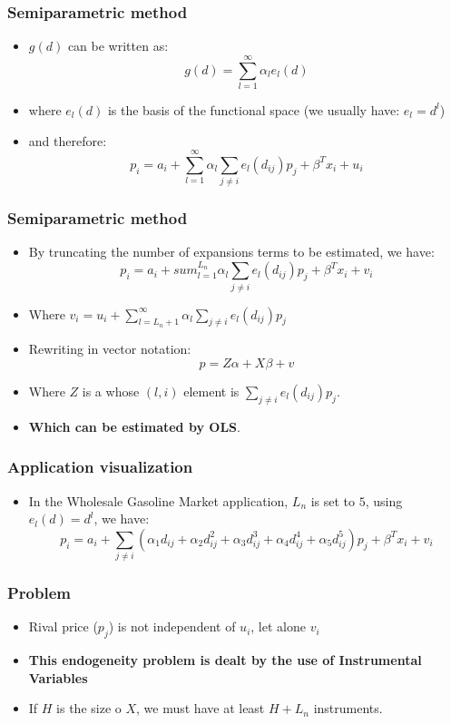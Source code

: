 \documentclass{beamer}
\begin{document}
\begin{frame}
  \frametitle{Semiparametric method}
  \begin{itemize}
    \item $g(d)$ can be written as:
      \[g(d) = \sum^{\infty}_{l=1} \alpha_l e_l(d)\]
    \item where $e_l(d)$ is the basis of the functional space (we usually have: $e_l = d^l$)
    \item and therefore:
      \[p_i  = a_i + \sum^{\infty}_{l=1} \alpha_l \sum_{j\ne i} e_l(d_{ij})p_j + \beta^Tx_i + u_i \]
  \end{itemize}
\end{frame}

\begin{frame}
  \frametitle{Semiparametric method}

  \begin{itemize}
    \item By truncating the number of expansions terms to be estimated, we have:
      \[p_i  = a_i + sum^{L_n}_{l=1} \alpha_l \sum_{j\ne i} e_l(d_{ij})p_j + \beta^Tx_i + v_i \]
    \item Where $v_i = u_i + \sum^{\infty}_{l=L_n+1} \alpha_l \sum_{j\ne i} e_l(d_{ij})p_j$
    \item Rewriting in vector notation:
      \[p = Z \alpha + X \beta  + v\]
    \item Where $Z$ is a whose $(l,i)$ element is $\sum_{j\ne i} e_l(d_{ij})p_j$.
    \item \textbf{Which can be estimated by OLS}.
  \end{itemize}
  
\end{frame}

\begin{frame}
  \frametitle{Application visualization}

  \begin{itemize}
    \item In the Wholesale Gasoline Market application, $L_n$ is set to $5$, using $e_l(d) = d^l$, we have:
      \[p_i  =  a_i + \sum_{j\ne i} (\alpha_1d_{ij} + \alpha_2d^2_{ij} + \alpha_3d^3_{ij} + \alpha_4d^4_{ij} + \alpha_5d^5_{ij})p_j + \beta^Tx_i + v_i \]
  \end{itemize}
  
\end{frame}

\begin{frame}
  \frametitle{Problem}
  \begin{itemize}
    \item Rival price ($p_j$) is not independent of $u_i$, let alone $v_i$
    \item \textbf{This endogeneity problem is dealt by the use of Instrumental Variables}
    \item If $H$ is the size o $X$, we must have at least $H + L_n$ instruments.
  \end{itemize}
\end{frame}
\end{document}
